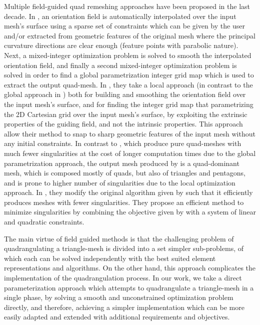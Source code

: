 \par
\noindent Multiple field-guided quad remeshing approaches have been proposed in the last decade. In \cite{10.1145/1531326.1531383}, an orientation field is automatically interpolated over the input mesh's surface using a sparse set of constraints which can be given by the user and/or extracted from geometric features of the original mesh where the principal curvature directions are clear enough (feature points with parabolic nature). Next, a mixed-integer optimization problem is solved to smooth the interpolated orientation field, and  finally a second mixed-integer optimization problem is solved in order to find a global parametrization integer grid map which is used to extract the output quad-mesh. In \cite{10.1145/2816795.2818078}, they take a local approach (in contrast to the global approach in \cite{10.1145/1531326.1531383}) both for building and smoothing the orientation field over the input mesh's surface, and for finding the integer grid map that parametrizing the 2D Cartesian grid over the input mesh's surface, by exploiting the extrinsic properties of the guiding field, and not the intrinsic properties. This approach allow their method to snap to sharp geometric features of the input mesh without any initial constraints. In contrast to \cite{10.1145/2816795.2818078}, which produce pure quad-meshes with much fewer singularities at the cost of longer computation times due to the global parametrization approach, the output mesh produced by \cite{10.1145/2816795.2818078} is a quad-dominant mesh, which is composed mostly of quads, but also of triangles and pentagons, and is prone to higher number of singularities due to the local optimization approach. In \cite{10.1111:cgf.13498}, they modify the original algorithm given by \cite{10.1145/2816795.2818078} such that it efficiently produces meshes with fewer singularities. They propose an efficient method to minimize singularities by combining the objective given by \cite{10.1145/2816795.2818078} with a system of linear and quadratic constraints.

\par
\noindent The main virtue of field guided methods is that the challenging problem of quadrangulating a triangle-mesh is divided into a set simpler sub-problems, of which each can be solved independently with the best suited element representations and algorithms. On the other hand, this approach complicates the implementation of the quadrangulation process. In our work, we take a direct parameterization approach which attempts to quadrangulate a triangle-mesh in a single phase, by solving a smooth and unconstrained optimization problem directly, and therefore, achieving a simpler implementation which can be more easily adapted and extended with additional requirements and objectives. 